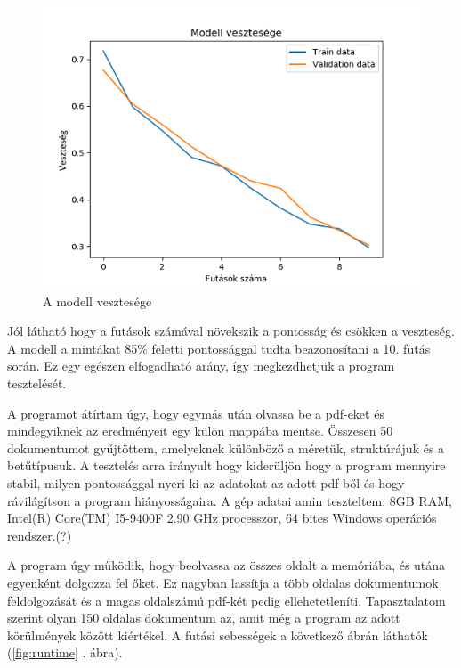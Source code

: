\begin{figure}[H]
\centering
\includegraphics[scale=1]{images/loss.png}
\caption{A modell vesztesége}
\label{fig:loss}
\end{figure}

Jól látható hogy a futások számával növekszik a pontosság és csökken a veszteség. A modell a mintákat 85\% feletti pontossággal tudta beazonosítani a 10. futás során. Ez egy egészen elfogadható arány, így megkezdhetjük a program tesztelését.


A programot átírtam úgy, hogy egymás után olvassa be a pdf-eket és mindegyiknek az eredményeit egy külön mappába mentse. Összesen 50 dokumentumot gyűjtöttem, amelyeknek különböző a méretük, struktúrájuk és a betűtípusuk. A tesztelés arra irányult hogy kiderüljön hogy a program mennyire stabil, milyen pontossággal nyeri ki az adatokat az adott pdf-ből és hogy rávilágítson a program hiányosságaira. A gép adatai amin teszteltem: 8GB RAM, Intel(R) Core(TM) I5-9400F 2.90 GHz processzor, 64 bites Windows operációs rendszer.(?)


 A program úgy működik, hogy beolvassa az összes oldalt a memóriába, és utána egyenként dolgozza fel őket. Ez nagyban lassítja a több oldalas dokumentumok feldolgozását és a magas oldalszámú pdf-két pedig ellehetetleníti. Tapasztalatom szerint olyan 150 oldalas dokumentum az, amit még a program az adott körülmények között kiértékel. A futási sebességek a következő ábrán láthatók (\ref{fig:runtime} . ábra).

